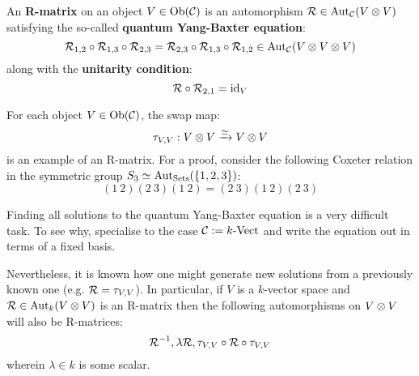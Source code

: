         \begin{definition}[R-matrices] \label{def: R_matrices}
            An \textbf{R-matrix} on an object $V \in \mathrm{Ob}(\mathcal{C})$ is an automorphism $\calR \in \Aut_{\C}(V \tensor V)$ satisfying the so-called \textbf{quantum Yang-Baxter equation}:
                $$\calR_{1, 2} \circ \calR_{1, 3} \circ \calR_{2, 3} = \calR_{2, 3} \circ \calR_{1, 3} \circ \calR_{1, 2} \in \Aut_{\C}(V \tensor V \tensor V)$$
            along with the \textbf{unitarity condition}:
                $$\mathcal{R} \circ \mathcal{R}_{2, 1} = \mathrm{id}_V$$
        \end{definition}
        \begin{example}
            For each object $V \in \mathrm{Ob}(\mathcal{C})$, the swap map:
                $$\tau_{V, V}: V \tensor V \xrightarrow[]{\cong} V \tensor V$$
            is an example of an R-matrix. For a proof, consider the following Coxeter relation in the symmetric group $S_3 \simeq \mathrm{Aut}_{\mathrm{Sets}}(\{1, 2, 3\})$:
                $$(1 \: 2)(2 \: 3)(1 \: 2) = (2 \: 3)(1 \: 2)(2 \: 3)$$
        \end{example}
        \begin{remark}
            Finding all solutions to the quantum Yang-Baxter equation is a very difficult task. To see why, specialise to the case $\mathcal{C} := k\text{-}\mathrm{Vect}$ and write the equation out in terms of a fixed basis. 
            
            Nevertheless, it is known how one might generate new solutions from a previously known one (e.g. $\mathcal{R} = \tau_{V, V}$). In particular, if $V$ is a $k$-vector space and $\calR \in \Aut_k(V \tensor V)$ is an R-matrix then the following automorphisms on $V \tensor V$ will also be R-matrices:
                $$\mathcal{R}^{-1}, \lambda \mathcal{R}, \tau_{V, V} \circ \mathcal{R} \circ \tau_{V, V}$$
            wherein $\lambda \in k$ is some scalar.
        \end{remark}
